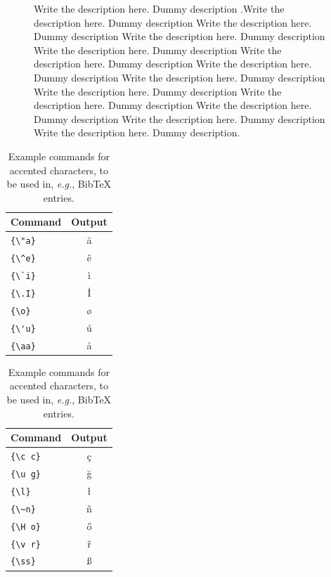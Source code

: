 \documentclass[9pt]{article}
\begin{document}
\begin{figure}
\begin{multicols}{2}
\end{multicols}
Write the description here. Dummy description .Write the description here. Dummy description Write the description here. Dummy description Write the description here. Dummy description Write the description here. Dummy description Write the description here. Dummy description Write the description here. Dummy description Write the description here. Dummy description Write the description here. Dummy description Write the description here. Dummy description Write the description here. Dummy description Write the description here. Dummy description Write the description here. Dummy description.

\end{figure}







\begin{table}
\centering
\begin{tabular}{lc}
\hline
\textbf{Command} & \textbf{Output}\\
\hline
\verb|{\"a}| & {\"a} \\
\verb|{\^e}| & {\^e} \\
\verb|{\`i}| & {\`i} \\ 
\verb|{\.I}| & {\.I} \\ 
\verb|{\o}| & {\o} \\
\verb|{\'u}| & {\'u}  \\ 
\verb|{\aa}| & {\aa}  \\\hline
\end{tabular}
\begin{tabular}{lc}
\hline
\textbf{Command} & \textbf{Output}\\
\hline
\verb|{\c c}| & {\c c} \\ 
\verb|{\u g}| & {\u g} \\ 
\verb|{\l}| & {\l} \\ 
\verb|{\~n}| & {\~n} \\ 
\verb|{\H o}| & {\H o} \\ 
\verb|{\v r}| & {\v r} \\ 
\verb|{\ss}| & {\ss} \\
\hline
\end{tabular}
\caption{Example commands for accented characters, to be used in, \emph{e.g.}, Bib\TeX{} entries.}
\label{tab:accents}
\end{table}
\end{document}
